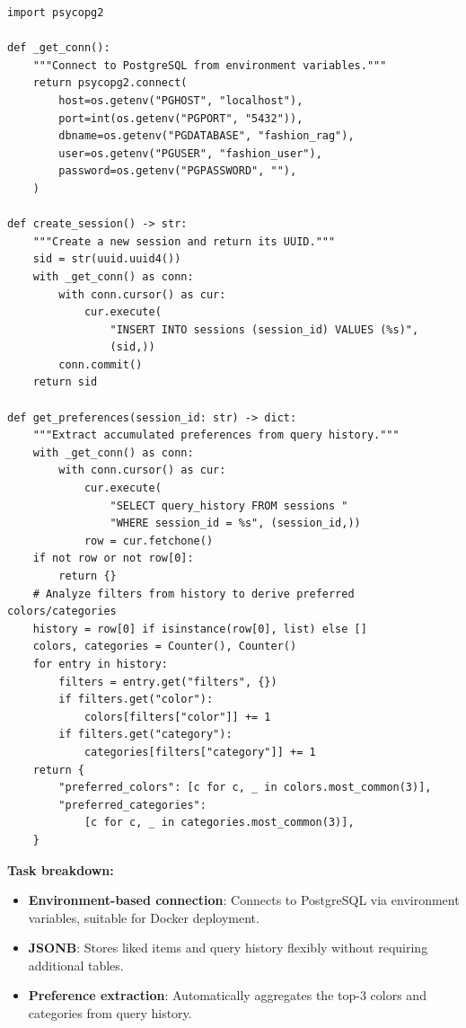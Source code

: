 \begin{lstlisting}[caption={PostgreSQL Data Access Layer --- agent/memory.py}]
import psycopg2

def _get_conn():
    """Connect to PostgreSQL from environment variables."""
    return psycopg2.connect(
        host=os.getenv("PGHOST", "localhost"),
        port=int(os.getenv("PGPORT", "5432")),
        dbname=os.getenv("PGDATABASE", "fashion_rag"),
        user=os.getenv("PGUSER", "fashion_user"),
        password=os.getenv("PGPASSWORD", ""),
    )

def create_session() -> str:
    """Create a new session and return its UUID."""
    sid = str(uuid.uuid4())
    with _get_conn() as conn:
        with conn.cursor() as cur:
            cur.execute(
                "INSERT INTO sessions (session_id) VALUES (%s)",
                (sid,))
        conn.commit()
    return sid

def get_preferences(session_id: str) -> dict:
    """Extract accumulated preferences from query history."""
    with _get_conn() as conn:
        with conn.cursor() as cur:
            cur.execute(
                "SELECT query_history FROM sessions "
                "WHERE session_id = %s", (session_id,))
            row = cur.fetchone()
    if not row or not row[0]:
        return {}
    # Analyze filters from history to derive preferred colors/categories
    history = row[0] if isinstance(row[0], list) else []
    colors, categories = Counter(), Counter()
    for entry in history:
        filters = entry.get("filters", {})
        if filters.get("color"):
            colors[filters["color"]] += 1
        if filters.get("category"):
            categories[filters["category"]] += 1
    return {
        "preferred_colors": [c for c, _ in colors.most_common(3)],
        "preferred_categories":
            [c for c, _ in categories.most_common(3)],
    }
\end{lstlisting}

\textbf{Task breakdown:}
\begin{itemize}
    \item \textbf{Environment-based connection}: Connects to PostgreSQL via environment variables, suitable for Docker deployment.
    \item \textbf{JSONB}: Stores liked items and query history flexibly without requiring additional tables.
    \item \textbf{Preference extraction}: Automatically aggregates the top-3 colors and categories from query history.
\end{itemize}

